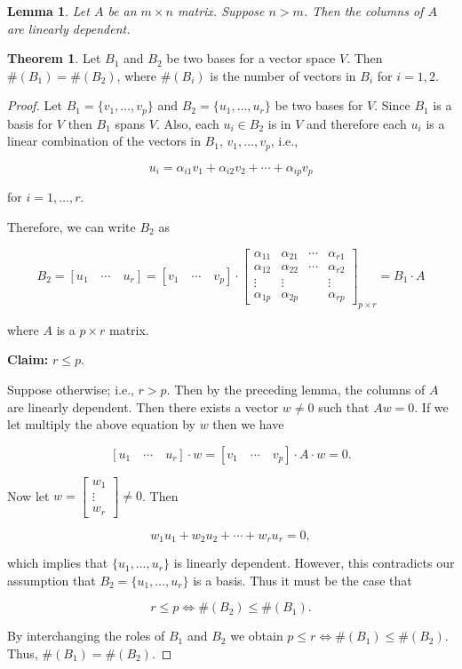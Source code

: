 \documentclass[12pt]{article}
\newtheorem*{lemma}{Lemma}
\theoremstyle{definition}
\newtheorem{theorem}{Theorem}[section]  %
\begin{document}
\begin{lemma}
Let $A$ be an $m \times n$ matrix. Suppose $n > m$. Then the columns of $A$ are linearly dependent.
\end{lemma}

\begin{theorem}
Let $B_1$ and $B_2$ be two bases for a vector space $V$. Then $\#(B_1) = \#(B_2)$, where $\#(B_i)$
is the number of vectors in $B_i$ for $i = 1,2$.
\end{theorem}

\begin{proof}
Let $B_1 = \{ v_1, \ldots, v_p \}$ and $B_2 = \{u_1, \ldots, u_r \}$ be two bases for $V$. Since
$B_1$ is a basis for $V$ then $B_1$ spans $V$. Also, each $u_i \in B_2$ is in $V$ and therefore each
$u_i$ is a linear combination of the vectors in $B_1$, $v_1, \ldots, v_p$, i.e.,

\[ u_i = \alpha_{i1} v_1 + \alpha_{i2} v_2 + \cdots + \alpha_{ip} v_p \]

for $i = 1, \ldots, r$.

Therefore, we can write $B_2$ as

\[ B_2 = [u_1 \quad \cdots \quad u_r ] = [v_1 \quad \cdots \quad v_p ] \cdot
\begin{bmatrix}
\alpha_{11} & \alpha_{21} & \cdots & \alpha_{r1} \\
\alpha_{12} & \alpha_{22} & \cdots & \alpha_{r2} \\
\vdots & \vdots & & \vdots \\
\alpha_{1p} & \alpha_{2p} & & \alpha_{rp}
\end{bmatrix}_{p \times r}
=
B_1 \cdot A
\]

where $A$ is a $p \times r$ matrix.

\vspace{0.5cm}

\textbf{Claim:} $r \leq p$.

\vspace{0.5cm}


Suppose otherwise; i.e., $r > p$. Then by the preceding lemma, the columns of $A$ are linearly
dependent. Then there exists a vector $w \neq 0$ such that $Aw = 0$. If we let multiply the
above equation by $w$ then we have

\[ [u_1 \quad \cdots \quad u_r] \cdot w = [v_1 \quad \cdots \quad v_p] \cdot A \cdot w = 0.\]

Now let $w = \begin{bmatrix} w_1 \\ \vdots \\ w_r \end{bmatrix} \neq 0$. Then

\[ w_1 u_1 + w_2 u_2 + \cdots + w_r u_r = 0, \]

which implies that $\{u_1, \ldots, u_r \}$ is linearly dependent. However, this contradicts
our assumption that $B_2 = \{u_1, \ldots, u_r \}$ is a basis. Thus it must be the case
that 

\[r \leq p \iff \#(B_2) \leq \#(B_1) .\]

By interchanging the roles of $B_1$ and $B_2$ we obtain $p \leq r \iff \#(B_1) \leq \#(B_2)$.
Thus, $\#(B_1) = \#(B_2)$.
\end{proof}
\end{document}
